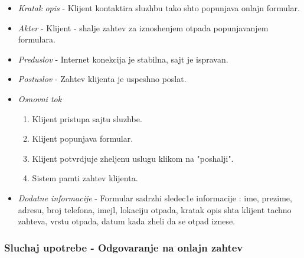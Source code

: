 \documentclass[10 pt]{article}
\begin{document}
		\begin{itemize}
			
			\item\textit{Kratak opis} - Klijent kontaktira sluzhbu tako shto popunjava onlajn formular.
	
			\item\textit{Akter} - Klijent - shalje zahtev za iznoshenjem otpada popunjavanjem formulara.
			
			\item\textit{Preduslov} - Internet konekcija je stabilna, sajt je ispravan.
			
			\item\textit{Postuslov} - Zahtev klijenta je uspeshno poslat.

			
			\item\textit{Osnovni tok} 
				\begin{enumerate}
					\item Klijent pristupa sajtu sluzhbe.
					\item Klijent popunjava formular.
					\item Klijent potvrdjuje zheljenu uslugu klikom na "poshalji".
					\item Sistem pamti zahtev klijenta.
				\end{enumerate}
			
			\item\textit{Dodatne informacije}
- Formular sadrzhi sledec1e informacije : ime, prezime, adresu, broj telefona, imejl, lokaciju otpada, kratak opis shta klijent tachno zahteva, vrstu otpada, datum kada zheli da se otpad iznese.
			

		\end{itemize}
	
	\subsubsection{Sluchaj upotrebe - Odgovaranje na onlajn zahtev}
	
\end{document}
